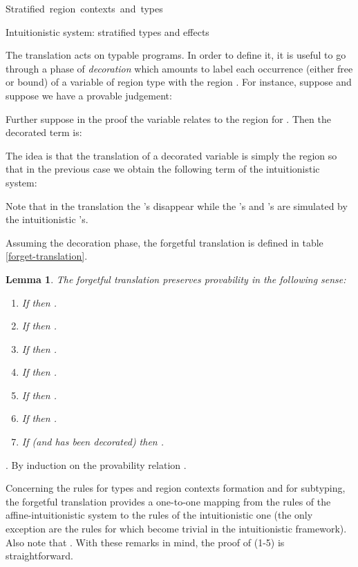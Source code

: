 \documentclass[11pt]{article}
\newtheorem{lemma}[theorem]{Lemma}
\newcommand{\Proof}{\noindent {\sc Proof}. }
\begin{document}
\begin{table}
{\footnotesize
\begin{center}
\mbox{{\sc Stratified region contexts and types}}  \\
\end{center}
}
\caption{Intuitionistic system: stratified types and effects}\label{summary2}
\end{table}

The translation acts on typable programs.  In order to define it, it
is useful to go through a phase of {\em decoration} which amounts to label
each occurrence (either free or bound) of a variable  of region 
type  with the region .  
For instance,  suppose  and
suppose we have a provable judgement:

Further suppose in the proof the variable  relates to the region  for .
Then the decorated term is:

The idea is that the translation of a
decorated variable  is simply the region  so that in the previous
case we obtain the following term of the intuitionistic system:

Note that in the translation the 's disappear while the 
's and 's are simulated by the intuitionistic
's. 

Assuming the decoration phase, the forgetful translation  is defined
in table \ref{forget-translation}.


\begin{lemma} 
The forgetful translation preserves provability
in the following sense:

\begin{enumerate}

\item If  then .

\item If  then .

\item If  then .

\item If  then
.

\item If  then
.

\item If  
then .

\item If  (and  has
been decorated) then
.
\end{enumerate}
\end{lemma}
\Proof
By induction on the provability relation .

Concerning the rules for types and region contexts formation and for subtyping,
the forgetful translation provides a one-to-one mapping 
from the rules of the affine-intuitionistic system to the
rules of the intuitionistic one (the only exception are the rules
for  which become trivial in the intuitionistic framework).
Also note that . 
With these remarks in mind, the proof of (1-5) is 
straightforward.
\end{document}
